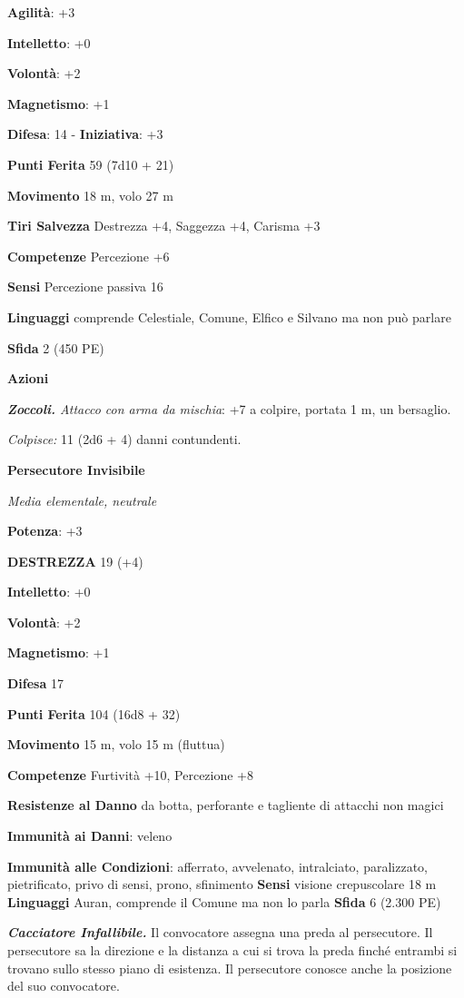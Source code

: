 \begin{multicols}{2}
\textbf{Agilità}: +3

\textbf{Intelletto}: +0

\textbf{Volontà}: +2

\textbf{Magnetismo}: +1

\textbf{Difesa}: 14 - \textbf{Iniziativa}: +3

\textbf{Punti Ferita} 59 (7d10 + 21)

\textbf{Movimento} 18 m, volo 27 m

\textbf{Tiri Salvezza} Destrezza +4, Saggezza +4, Carisma +3

\textbf{Competenze} Percezione +6

\textbf{Sensi} Percezione passiva 16

\textbf{Linguaggi} comprende Celestiale, Comune, Elfico e Silvano ma non
può parlare

\textbf{Sfida} 2 (450 PE)\smallskip

\smallskip\textbf{Azioni}

\emph{\textbf{Zoccoli.} Attacco con arma da mischia}: +7 a colpire,
portata 1 m, un bersaglio.

\emph{Colpisce:} 11 (2d6 + 4) danni contundenti.

\textbf{Persecutore Invisibile}

\emph{Media elementale, neutrale}

\textbf{Potenza}: +3

\textbf{DESTREZZA} 19 (+4)



\textbf{Intelletto}: +0

\textbf{Volontà}: +2

\textbf{Magnetismo}: +1

\textbf{Difesa} 17

\textbf{Punti Ferita} 104 (16d8 + 32)

\textbf{Movimento} 15 m, volo 15 m (fluttua)

\textbf{Competenze} Furtività +10, Percezione +8

\textbf{Resistenze al Danno} da botta, perforante e tagliente di
attacchi non magici

\textbf{Immunità ai Danni}: veleno

\textbf{Immunità alle Condizioni}: afferrato, avvelenato, intralciato,
paralizzato, pietrificato, privo di sensi, prono, sfinimento
\textbf{Sensi} visione crepuscolare 18 m
\textbf{Linguaggi} Auran, comprende il Comune ma non lo parla
\textbf{Sfida} 6 (2.300 PE)\smallskip

\emph{\textbf{Cacciatore Infallibile.}} Il convocatore assegna una preda
al persecutore. Il persecutore sa la direzione e la distanza a cui si
trova la preda finché entrambi si trovano sullo stesso piano di
esistenza. Il persecutore conosce anche la posizione del suo
convocatore.


\end{multicols}
